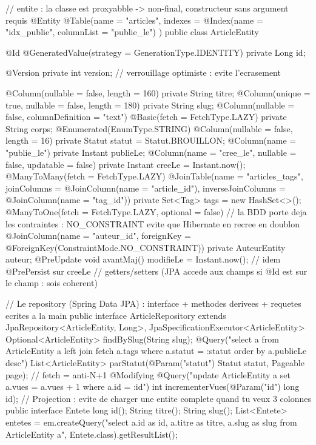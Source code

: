 \begin{codejava}
// entite : la classe est proxyabble -> non-final, constructeur sans argument requis
@Entity
@Table(name = "articles", indexes = { @Index(name = "idx_publie", columnList = "publie_le") })
public class ArticleEntity {
    @Id @GeneratedValue(strategy = GenerationType.IDENTITY)
    private Long id;

    @Version private int version;                    // verrouillage optimiste : evite l'ecrasement

    @Column(nullable = false, length = 160) private String titre;
    @Column(unique = true, nullable = false, length = 180) private String slug;
    @Column(nullable = false, columnDefinition = "text") @Basic(fetch = FetchType.LAZY) private String corps;
    @Enumerated(EnumType.STRING) @Column(nullable = false, length = 16) private Statut statut = Statut.BROUILLON;
    @Column(name = "publie_le") private Instant publieLe;
    @Column(name = "cree_le", nullable = false, updatable = false) private Instant creeLe = Instant.now();
    @ManyToMany(fetch = FetchType.LAZY)
    @JoinTable(name = "articles_tags",
               joinColumns = @JoinColumn(name = "article_id"), inverseJoinColumns = @JoinColumn(name = "tag_id"))
    private Set<Tag> tags = new HashSet<>();
    @ManyToOne(fetch = FetchType.LAZY, optional = false)
    // la BDD porte deja les contraintes : NO_CONSTRAINT evite que Hibernate en recree en doublon
    @JoinColumn(name = "auteur_id", foreignKey = @ForeignKey(ConstraintMode.NO_CONSTRAINT))
    private AuteurEntity auteur;
    @PreUpdate void avantMaj() { modifieLe = Instant.now(); }     // idem @PrePersist sur creeLe
    // getters/setters (JPA accede aux champs si @Id est sur le champ : sois coherent)
}

// Le repository (Spring Data JPA) : interface + methodes derivees + requetes ecrites a la main
public interface ArticleRepository extends JpaRepository<ArticleEntity, Long>, JpaSpecificationExecutor<ArticleEntity> {
    Optional<ArticleEntity> findBySlug(String slug);
    @Query("select a from ArticleEntity a left join fetch a.tags where a.statut = :statut order by a.publieLe desc")
    List<ArticleEntity> parStatut(@Param("statut") Statut statut, Pageable page);   // fetch = anti-N+1
    @Modifying @Query("update ArticleEntity a set a.vues = a.vues + 1 where a.id = :id")
    int incrementerVues(@Param("id") long id);
}
// Projection : evite de charger une entite complete quand tu veux 3 colonnes
public interface Entete { long id(); String titre(); String slug(); }
List<Entete> entetes = em.createQuery("select a.id as id, a.titre as titre, a.slug as slug from ArticleEntity a", Entete.class).getResultList();


\end{codejava}
